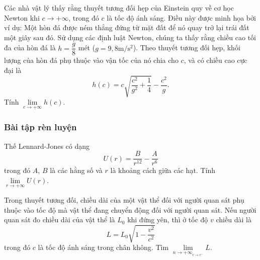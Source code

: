 \begin{vd}%
Các nhà vật lý  thấy rằng thuyết tương đối hẹp của Einstein quy về cơ học Newton khi $c \rightarrow +\infty$, trong đó $c$ là tốc độ ánh sáng. Điều này được minh họa bởi ví dụ: Một hòn đá được ném thẳng đứng từ mặt đất để nó quay trở lại trái đất một giây sau đó. Sử dụng các định luật Newton, chúng ta thấy rằng chiều cao tối đa của hòn đá là $h=\dfrac{g}{8}$ mét ($g = 9{,}8 \mathrm{m/ s ^2}$). Theo thuyết tương đối hẹp, khối lượng của hòn đá phụ thuộc vào vận tốc của nó chia cho $c$, và có chiều cao cực đại là 
\[
h(c)=c \sqrt{\dfrac{c^2}{g^2}+\dfrac{1}{4}}- \dfrac{c^2}{g}.
\]
Tính $\lim\limits _{c \rightarrow +\infty} h(c)$.
\end{vd}



\subsubsection{Bài tập rèn luyện}
\begin{bt}%
Thế Lennard-Jones có dạng $$U(r) = \dfrac{B}{r^{12}} - \dfrac{A}{r^6}$$ trong đó $A$, $B$ là các hằng số và $r$ là khoảng cách giữa các hạt. 
Tính $\lim\limits _{r \rightarrow +\infty} U(r)$.
\end{bt}

\begin{bt}%
Trong thuyết tương đối, chiều dài của một vật thể đối với người quan sát phụ thuộc vào tốc độ mà vật thể đang chuyển động đối với người quan sát. Nếu người quan sát đo chiều dài của vật thể là $L_0$ khi đứng yên, thì ở tốc độ $v$ chiều dài  là
$$
L=L_0 \sqrt{1-\frac{v^2}{c^2}}
$$
trong đó $c$ là tốc độ ánh sáng trong chân không. Tìm $\displaystyle \lim \limits_{n \to +\infty}_{v \rightarrow c^{-}} L$. 
\end{bt}

